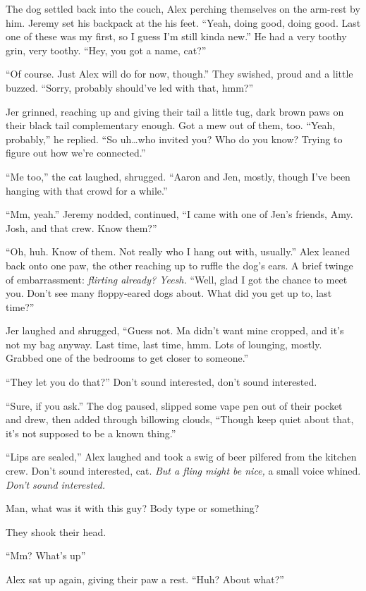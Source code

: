 The dog settled back into the couch, Alex perching themselves on the arm-rest by him. Jeremy set his backpack at the his feet. ``Yeah, doing good, doing good. Last one of these was my first, so I guess I'm still kinda new.'' He had a very toothy grin, very toothy. ``Hey, you got a name, cat?''

``Of course. Just Alex will do for now, though.'' They swished, proud and a little buzzed. ``Sorry, probably should've led with that, hmm?''

Jer grinned, reaching up and giving their tail a little tug, dark brown paws on their black tail complementary enough. Got a mew out of them, too. ``Yeah, probably,'' he replied. ``So uh\ldots{}who invited you? Who do you know? Trying to figure out how we're connected.''

``Me too,'' the cat laughed, shrugged. ``Aaron and Jen, mostly, though I've been hanging with that crowd for a while.''

``Mm, yeah.'' Jeremy nodded, continued, ``I came with one of Jen's friends, Amy. Josh, and that crew. Know them?''

``Oh, huh. Know of them. Not really who I hang out with, usually.'' Alex leaned back onto one paw, the other reaching up to ruffle the dog's ears. A brief twinge of embarrassment: \emph{flirting already? Yeesh.} ``Well, glad I got the chance to meet you. Don't see many floppy-eared dogs about. What did you get up to, last time?''

Jer laughed and shrugged, ``Guess not. Ma didn't want mine cropped, and it's not my bag anyway. Last time, last time, hmm. Lots of lounging, mostly. Grabbed one of the bedrooms to get closer to someone.''

``They let you do that?'' Don't sound interested, don't sound interested.

``Sure, if you ask.'' The dog paused, slipped some vape pen out of their pocket and drew, then added through billowing clouds, ``Though keep quiet about that, it's not supposed to be a known thing.''

``Lips are sealed,'' Alex laughed and took a swig of beer pilfered from the kitchen crew. Don't sound interested, cat. \emph{But a fling might be nice,} a small voice whined. \emph{Don't sound interested.}

Man, what was it with this guy? Body type or something?

They shook their head.

``Mm? What's up''

Alex sat up again, giving their paw a rest. ``Huh? About what?''

